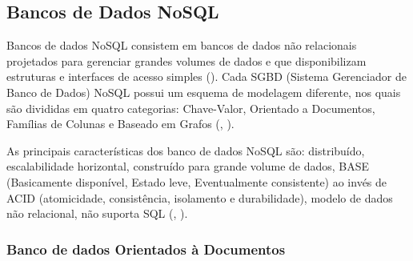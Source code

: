 \begin{itemize}
	
\end{itemize}


\subsection{Bancos de Dados NoSQL}

Bancos de dados NoSQL consistem em bancos de dados não relacionais projetados para gerenciar grandes volumes de dados e que disponibilizam estruturas e interfaces de acesso simples (\cite{lima:2015}). Cada SGBD (Sistema Gerenciador de Banco de Dados) NoSQL possui um esquema de modelagem diferente, nos quais são divididas em quatro categorias: Chave-Valor, Orientado a Documentos, Famílias de Colunas e Baseado em Grafos (\cite{fowler:2013}, \cite{kaur:2013}).

As principais características dos banco de dados NoSQL são: distribuído, escalabilidade horizontal, construído para grande volume de dados, BASE (Basicamente disponível, Estado leve, Eventualmente consistente) ao invés de ACID (atomicidade, consistência, isolamento e durabilidade), modelo de dados não relacional, não suporta SQL (\cite{fowler:2013}, \cite{nasholm:2012}).

\subsubsection{Banco de dados Orientados à Documentos}

